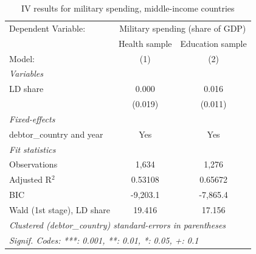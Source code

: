 
\begin{table}[htbp]
   \caption{\label{tab:results_iv_unrel_outcome_other} IV results for military spending, middle-income countries}
   \centering
   \begin{tabular}{lcc}
      \tabularnewline \midrule \midrule
      Dependent Variable: & \multicolumn{2}{c}{Military spending (share of GDP)}\\
                                 & Health sample & Education sample \\   
      Model:                     & (1)           & (2)\\  
      \midrule
      \emph{Variables}\\
      LD share                   & 0.000         & 0.016\\   
                                 & (0.019)       & (0.011)\\   
      \midrule
      \emph{Fixed-effects}\\
      debtor\_country and year   & Yes           & Yes\\  
      \midrule
      \emph{Fit statistics}\\
      Observations               & 1,634         & 1,276\\  
      Adjusted R$^2$             & 0.53108       & 0.65672\\  
      BIC                        & -9,203.1      & -7,865.4\\  
      Wald (1st stage), LD share & 19.416        & 17.156\\  
      \midrule \midrule
      \multicolumn{3}{l}{\emph{Clustered (debtor\_country) standard-errors in parentheses}}\\
      \multicolumn{3}{l}{\emph{Signif. Codes: ***: 0.001, **: 0.01, *: 0.05, +: 0.1}}\\
   \end{tabular}
\end{table}


